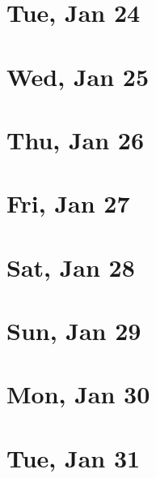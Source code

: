 	\section{Tue, Jan 24}
		
	\section{Wed, Jan 25}
		
	\section{Thu, Jan 26}
		
	\section{Fri, Jan 27}
		
	\section{Sat, Jan 28}
		
	\section{Sun, Jan 29}
		
	\section{Mon, Jan 30}
		
	\section{Tue, Jan 31}
		
